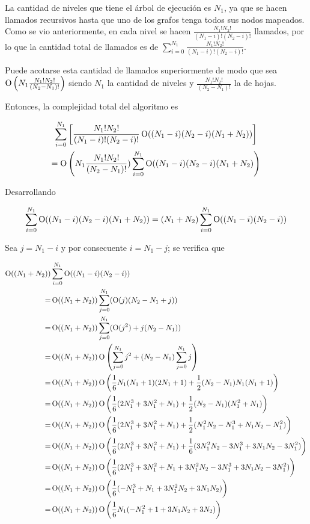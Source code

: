 La cantidad de niveles que tiene el árbol de ejecución es $N_1$, ya que se
hacen llamados recursivos hasta que uno de los grafos tenga todos sus nodos
mapeados. Como se vio anteriormente, en cada nivel se hacen
$\frac{N_1!  N_2!}{(N_1 - i)!  (N_2 - i)!}$ llamados, por lo que
la cantidad total de llamados es de
$\sum_{i = 0}^{N_1} \frac{N_1!  N_2!}{(N_1 - i)!  (N_2 - i)!}$.

Puede acotarse esta cantidad de llamados superiormente de modo que sea
$\operatorname{O} \left(N_1  \frac{N_1!  N_2!}{(N_2 - N_1)!} \right)$ siendo $N_1$ la
cantidad de niveles y $\frac{N_1!  N_2!}{(N_2 - N_1)!}$ la de hojas.

\vspace{1em}

Entonces, la complejidad total del algoritmo es

\begin{multline*}
\sum_{i = 0}^{N_1}\left[\frac{N_1!  N_2!}{(N_1 - i)!  (N_2 - i)!}
\operatorname{O}((N_1 - i)  (N_2 - i)  (N_1 + N_2))\right] \\
= \operatorname{O}\left(N_1  \frac{N_1!  N_2!}{(N_2 - N_1)!})
\sum_{i = 0}^{N_1}\operatorname{O}((N_1 - i)  (N_2 - i)
(N_1 + N_2)\right)
\end{multline*}

Desarrollando

\[
\sum_{i = 0}^{N_1}\operatorname{O}((N_1 - i)  (N_2 - i)
 (N_1 + N_2))=
(N_1 + N_2)  \sum_{i = 0}^{N_1}\operatorname{O}((N_1 - i)  (N_2 - i))
\]

Sea $j = N_1 - i$ y por consecuente $i = N_1 - j$; se verifica que

\begin{align*}
\operatorname{O}((N_1 + N_2)) & \sum_{i = 0}^{N_1} \operatorname{O}((N_1 - i)  (N_2 - i)) \\
=& \operatorname{O}((N_1 + N_2))  \sum_{j = 0}^{N_1} (\operatorname{O}(j)  (N_2 - N_1 + j)) \\
=& \operatorname{O}((N_1 + N_2))  \sum_{j = 0}^{N_1} (\operatorname{O}(j^2) + j  (N_2 - N_1)) \\
=& \operatorname{O}((N_1 + N_2))  \operatorname{O}\left(\sum_{j = 0}^{N_1} j^2 + (N_2 - N_1)  \sum_{j = 0}^{N_1} j\right) \\
=& \operatorname{O}((N_1 + N_2))  \operatorname{O}\left(\frac{1}{6}N_1(N_1 + 1)(2N_1 + 1) + \frac{1}{2}(N_2 - N_1)N_1(N_1 + 1)\right) \\
=& \operatorname{O}((N_1 + N_2))  \operatorname{O}\left(\frac{1}{6}(2N_1^3 + 3N_1^2 + N_1) + \frac{1}{2}(N_2 - N_1)(N_1^2 + N_1)\right) \\
=& \operatorname{O}((N_1 + N_2))  \operatorname{O}\left(\frac{1}{6}(2N_1^3 + 3N_1^2 + N_1) + \frac{1}{2}(N_1^2N_2 - N_1^3 + N_1N_2 - N_1^2)\right) \\
=& \operatorname{O}((N_1 + N_2))  \operatorname{O}\left(\frac{1}{6}(2N_1^3 + 3N_1^2 + N_1) + \frac{1}{6}(3N_1^2N_2 - 3N_1^3 + 3N_1N_2 - 3N_1^2)\right) \\
=& \operatorname{O}((N_1 + N_2))  \operatorname{O}\left(\frac{1}{6}(2N_1^3 + 3N_1^2 + N_1 + 3N_1^2N_2 - 3N_1^3 + 3N_1N_2 - 3N_1^2)\right) \\
=& \operatorname{O}((N_1 + N_2))  \operatorname{O}\left(\frac{1}{6}(-N_1^3 + N_1 + 3N_1^2N_2 + 3N_1N_2)\right) \\
=& \operatorname{O}((N_1 + N_2))  \operatorname{O}\left(\frac{1}{6}N_1(-N_1^2 + 1 + 3N_1N_2 + 3N_2)\right) \\
\end{align*}

